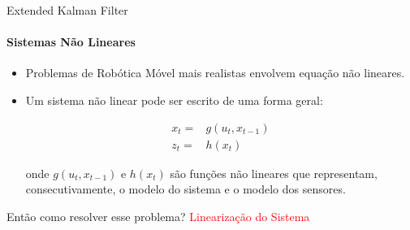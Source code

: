\documentclass[aspectratio=169]{beamer}
\begin{document}
\begin{frame}[t]{Extended Kalman Filter}
    \framesubtitle{Sistemas Não Lineares}

    \begin{itemize}
        \item Problemas de Robótica Móvel mais realistas envolvem equação não lineares.
        \item Um sistema não linear pode ser escrito de uma forma geral:
        
        \begin{equation}
            \begin{split}
            x_t = & g(u_t, x_{t-1})\\
            z_t = & h(x_t)
            \end{split}
        \end{equation}
    
    onde $g(u_t, x_{t-1})$ e $h(x_t)$ são funções não lineares que representam, consecutivamente, 
    o modelo do sistema e o modelo dos sensores.

    \end{itemize}

    \begin{block}{Então como resolver esse problema?}
        \centering
        \Large{\textcolor{red}{Linearização do Sistema}}
    \end{block}

\end{frame}
\end{document}
